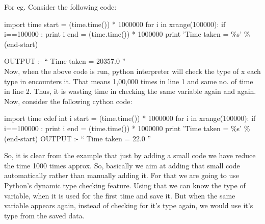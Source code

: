 For eg. Consider the following code:


\begin{code}

import time
start = (time.time()) * 1000000 
for i in xrange(100000): 
            if i==100000 : 
                        print i 
end = (time.time()) * 1000000 
print 'Time taken = \%s' \%(end-start)
\end{code}

OUTPUT :-  “ Time taken = 20357.0 ”
\\

Now, when the above code is run, python interpreter will check the type of x each type in encounters it. That means 1,00,000 times in line 1 and same no. of time in line 2. Thus, it is wasting time in checking the same variable again and again.
Now, consider the following cython code:
\begin{code}

import time
cdef int i
start = (time.time()) * 1000000 
for i in xrange(100000): 
            if i==100000 : 
                        print i 
end = (time.time()) * 1000000 
print 'Time taken = \%s' \%(end-start)
OUTPUT :-  “ Time taken = 22.0 ”
\end{code}

So, it is clear from the example that just by adding a small code we have reduce the time 1000 times approx. So, basically we aim at adding that small code automatically rather than manually adding it.
For that we are going to use Python's dynamic type checking feature. Using that we can know the type of variable, when it is used for the first time and save it. But when the same variable appears again, instead of checking for it's type again, we would use it's type from the saved data.

\vspace*{\fill}

